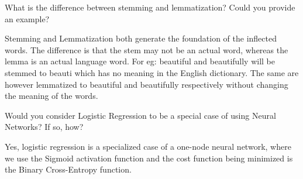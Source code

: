 	\begin{qanda}
		\begin{question}
What is the difference between stemming and lemmatization? Could you provide an example?
		\end{question}
		\begin{answer}
Stemming and Lemmatization both generate the foundation of the inflected words. The difference is that the stem may not be an actual word, whereas the lemma is an actual language word. For eg: beautiful and beautifully will be stemmed to beauti which has no meaning in the English dictionary. The same are however lemmatized to beautiful and beautifully respectively without changing the meaning of the words.
		\end{answer}
	\end{qanda}

	\begin{qanda}
		\begin{question}
Would you consider Logistic Regression to be a special case of using Neural Networks? If so, how?
		\end{question}
		\begin{answer}
Yes, logistic regression is a specialized case of a one-node neural network, where we use the Sigmoid activation function and the cost function being minimized is the Binary Cross-Entropy function.
		\end{answer}
	\end{qanda}